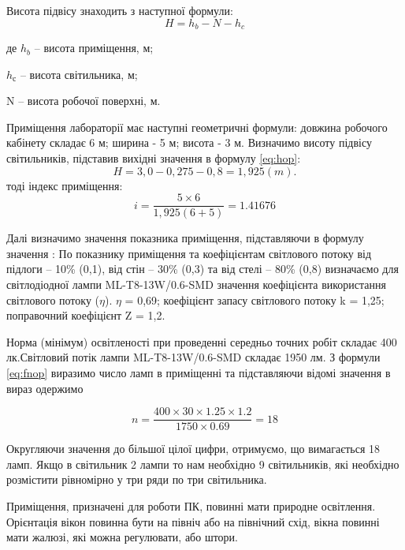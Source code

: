 Висота підвісу знаходить з наступної формули:
\begin{equation}
\label{eq:hop}
 H =h_{b} - N - h_{c} 
\end{equation}   
\begin{ESKDexplanation}
\item де $h_{b}$ – висота приміщення, м;
\item $h_{с}$ – висота світильника, м;
\item N – висота робочої поверхні, м.
\end{ESKDexplanation}
Приміщення лабораторії має наступні геометричні формули: довжина робочого кабінету складає 6 м;
ширина - 5 м; висота - 3 м. Визначимо висоту підвісу світильників, підставив вихідні значення в формулу \ref{eq:hop}:
\begin{equation}
 H =   3,0 - 0,275 - 0,8 = 1,925(m).
\end{equation}
тоді індекс приміщення:
\begin{equation*}
 i =  \frac{5 \times 6}{1,925(6+5)}= 1.41676
\end{equation*}            

Далі визначимо значення показника приміщення, підставляючи в формулу значення :       
По показнику приміщення та коефіцієнтам світлового потоку від підлоги – 10\% (0,1), від стін – 30\% (0,3) та від стелі – 80\% (0,8)
визначаємо для світлодіодної лампи ML-T8-13W/0.6-SMD значення коефіцієнта використання світлового потоку ($\eta$). $\eta$ = 0,69; коефіцієнт запасу світлового потоку k = 1,25; поправочний коефіцієнт Z = 1,2. 

Норма (мінімум) освітленості при проведенні середньо точних робіт складає 400 лк.Світловий потік лампи ML-T8-13W/0.6-SMD складає 1950 лм. З формули \ref{eq:fnop} виразимо число ламп в приміщенні та підставляючи відомі значення в вираз одержимо
 
\begin{equation}
 n = \frac{400 \times 30 \times 1.25 \times 1.2 }{1750 \times 0.69} = 18
\end{equation}

Округляючи значення до більшої цілої цифри, отримуємо, що вимагається 18 ламп. Якщо в світильник 2 лампи то нам необхідно 9 світильників, які необхідно розмістити рівномірно у три ряди по три світильника.

Приміщення, призначені для роботи ПК, повинні мати природне освітлення. Орієнтація вікон повинна бути на північ або на північний схід, вікна повинні мати жалюзі, які можна регулювати, або штори.

